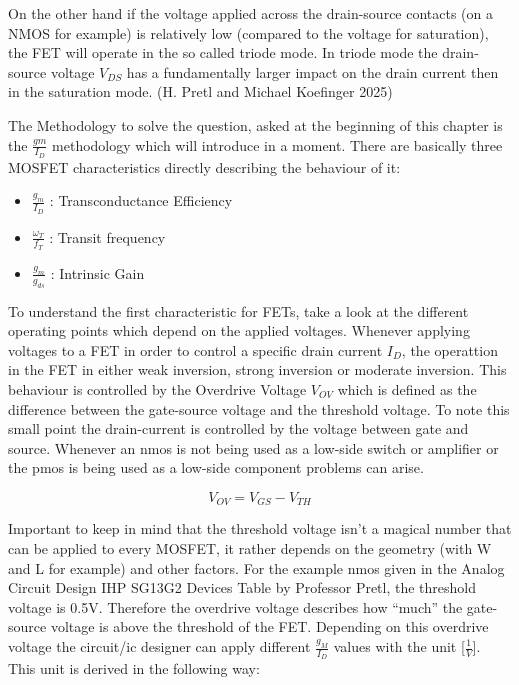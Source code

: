 \documentclass[
  letterpaper,
]{scrbook}
\providecommand{\tightlist}{%
  \setlength{\itemsep}{0pt}\setlength{\parskip}{0pt}}
\begin{document}
On the other hand if the voltage applied across the drain-source
contacts (on a NMOS for example) is relatively low (compared to the
voltage for saturation), the FET will operate in the so called triode
mode. In triode mode the drain-source voltage \(V_{DS}\) has a
fundamentally larger impact on the drain current then in the saturation
mode. (H. Pretl and Michael Koefinger 2025)

The Methodology to solve the question, asked at the beginning of this
chapter is the \(\frac{gm}{I_{D}}\) methodology which will introduce in
a moment. There are basically three MOSFET characteristics directly
describing the behaviour of it:

\begin{itemize}
\tightlist
\item
  \(\frac{g_m}{I_D}\) : Transconductance Efficiency
\item
  \(\frac{\omega_{T}}{f_T}\) : Transit frequency
\item
  \(\frac{g_m}{g_{ds}}\) : Intrinsic Gain
\end{itemize}

To understand the first characteristic for FETs, take a look at the
different operating points which depend on the applied voltages.
Whenever applying voltages to a FET in order to control a specific drain
current \(I_{D}\), the operattion in the FET in either weak inversion,
strong inversion or moderate inversion. This behaviour is controlled by
the Overdrive Voltage \(V_{OV}\) which is defined as the difference
between the gate-source voltage and the threshold voltage. To note this
small point the drain-current is controlled by the voltage between gate
and source. Whenever an nmos is not being used as a low-side switch or
amplifier or the pmos is being used as a low-side component problems can
arise.

\[
    V_{OV} = V_{GS} - V_{TH}
\]

Important to keep in mind that the threshold voltage isn't a magical
number that can be applied to every MOSFET, it rather depends on the
geometry (with W and L for example) and other factors. For the example
nmos given in the Analog Circuit Design IHP SG13G2 Devices Table by
Professor Pretl, the threshold voltage is 0.5V. Therefore the overdrive
voltage describes how ``much'' the gate-source voltage is above the
threshold of the FET. Depending on this overdrive voltage the circuit/ic
designer can apply different \(\frac{g_{M}}{I_{D}}\) values with the
unit {[}\(\frac{1}{V}\){]}. This unit is derived in the following way:
\end{document}

